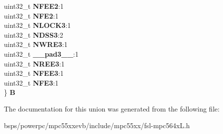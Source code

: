 \begin{DoxyCompactItemize}
\begin{tabbing}
\>uint32\_t {\bfseries NFEE2}:1\\
\>uint32\_t {\bfseries NFE2}:1\\
\>uint32\_t {\bfseries NLOCK3}:1\\
\>uint32\_t {\bfseries NDSS3}:2\\
\>uint32\_t {\bfseries NWRE3}:1\\
\>uint32\_t {\bfseries \_\_pad3\_\_}:1\\
\>uint32\_t {\bfseries NREE3}:1\\
\>uint32\_t {\bfseries NFEE3}:1\\
\>uint32\_t {\bfseries NFE3}:1\\
\} {\bfseries B}\\

\end{tabbing}\end{DoxyCompactItemize}


The documentation for this union was generated from the following file\+:\begin{DoxyCompactItemize}
\item 
bsps/powerpc/mpc55xxevb/include/mpc55xx/fsl-\/mpc564x\+L.\+h\end{DoxyCompactItemize}
